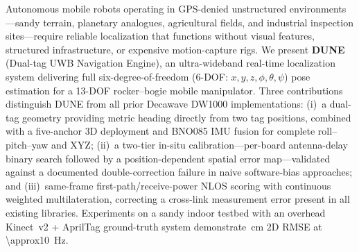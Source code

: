 
Autonomous mobile robots operating in GPS-denied unstructured environments---sandy
terrain, planetary analogues, agricultural fields, and industrial inspection
sites---require reliable localization that functions without visual
features, structured infrastructure, or expensive motion-capture rigs.
We present \textbf{DUNE} (Dual-tag UWB Navigation Engine), an ultra-wideband
real-time localization system delivering full six-degree-of-freedom
(6-DOF: $x, y, z, \phi, \theta, \psi$) pose estimation for a 13-DOF
rocker--bogie mobile manipulator.
Three contributions distinguish DUNE from all prior Decawave DW1000 implementations:
(i)~a dual-tag geometry providing metric heading directly from two tag positions,
combined with a five-anchor 3D deployment and BNO085 IMU fusion for complete
roll--pitch--yaw and XYZ;
(ii)~a two-tier in-situ calibration---per-board antenna-delay binary search
followed by a position-dependent spatial error map---validated against a documented
double-correction failure in naive software-bias approaches;
and (iii)~same-frame first-path/receive-power NLOS scoring with continuous weighted
multilateration, correcting a cross-link measurement error present in all
existing libraries.
Experiments on a sandy indoor testbed with an overhead Kinect~v2 + AprilTag
ground-truth system demonstrate \,cm 2D RMSE at \SI{\approx10}{\hertz}.
